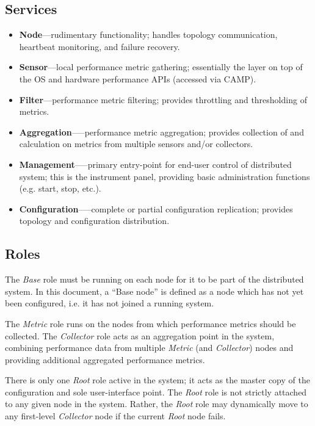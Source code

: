 \subsection{Services}

\begin{itemize}

\item \textbf{Node}---rudimentary \dcamp functionality; handles topology communication, heartbeat monitoring, and failure
      recovery.
\item \textbf{Sensor}---local performance metric gathering; essentially the \dcamp layer on top of the OS and hardware
      performance APIs (accessed via CAMP).
\item \textbf{Filter}---performance metric filtering; provides throttling and thresholding of metrics.
\item \textbf{Aggregation}--—performance metric aggregation; provides collection of and calculation on metrics from
      multiple sensors and/or collectors.
\item \textbf{Management}--—primary entry-point for end-user control of \dcamp distributed system; this is the \dcamp
      instrument panel, providing basic administration functions (e.g. start, stop, etc.).
\item \textbf{Configuration}--—complete or partial configuration replication; provides topology and configuration
      distribution.

\end{itemize}

\subsection{Roles}

The \textit{Base} role must be running on each node for it to be part of the \dcamp distributed system. In this document,
a ``Base node'' is defined as a \dcamp node which has not yet been configured, i.e. it has not joined a running \dcamp
system.

The \textit{Metric} role runs on the nodes from which performance metrics should be collected. The \textit{Collector}
role acts as an aggregation point in the system, combining performance data from multiple \textit{Metric} (and
\textit{Collector}) nodes and providing additional aggregated performance metrics.

There is only one \textit{Root} role active in the system; it acts as the master copy of the \dcamp configuration and
sole user-interface point. The \textit{Root} role is not strictly attached to any given node in the system. Rather, the
\textit{Root} role may dynamically move to any first-level \textit{Collector} node if the current \textit{Root} node
fails.

